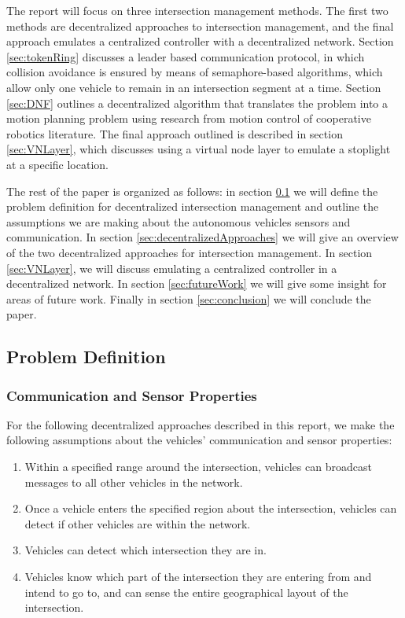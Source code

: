 \documentclass[12pt]{article}
\begin{document}
The report will focus on three intersection management methods.  The first two methods are decentralized approaches to intersection management, and the final approach emulates a centralized controller with a decentralized network.  Section \ref{sec:tokenRing}  discusses a leader based communication protocol, in which  collision avoidance is ensured by means of semaphore-based algorithms, which allow only one vehicle to remain in an intersection segment at a time.  Section \ref{sec:DNF} outlines a decentralized algorithm that translates the problem into a motion planning problem using research from motion control of cooperative robotics literature.  The final approach outlined is described in section \ref{sec:VNLayer}, which discusses using a virtual node layer to emulate a stoplight at a specific location. 
 
The rest of the  paper is organized as follows: in section \ref{sec:problemDefinition} we will define the problem definition for decentralized intersection management and outline the assumptions we are making about the autonomous vehicles sensors and communication.  In section \ref{sec:decentralizedApproaches} we will give an overview of the two decentralized approaches for intersection management.  In section \ref{sec:VNLayer}, we will discuss emulating a centralized controller in a decentralized network.  In section \ref{sec:futureWork} we will give some insight for areas of future work.  Finally in section \ref{sec:conclusion} we will conclude the paper.

\subsection{Problem Definition}
\label{sec:problemDefinition}
\subsubsection{Communication and Sensor Properties}
For the following decentralized approaches described in this report, we make the following assumptions about the vehicles' communication and sensor properties:
\begin{enumerate}
\item Within a specified range around the intersection, vehicles can broadcast messages to all other vehicles in the network. %
\item
Once a vehicle enters the specified region about the intersection, vehicles can detect if other vehicles are within the network. 
\item
Vehicles can detect which intersection they are in.
\item
Vehicles know which part of the intersection they are entering from and intend to go to, and can sense the entire geographical layout of the intersection.
\end{enumerate}
\end{document}
